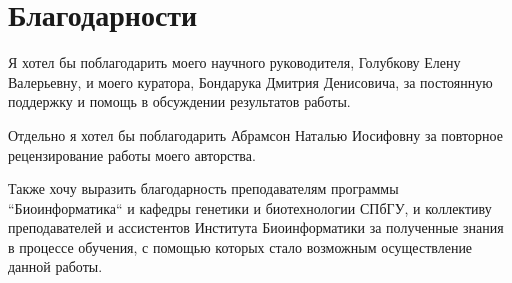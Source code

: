 \clearpage
\section{Благодарности}

Я хотел бы поблагодарить моего научного руководителя, Голубкову Елену Валерьевну, и моего куратора, Бондарука Дмитрия Денисовича, за постоянную поддержку и помощь в обсуждении результатов работы.

Отдельно я хотел бы поблагодарить Абрамсон Наталью Иосифовну за повторное рецензирование работы моего авторства.

Также хочу выразить благодарность преподавателям программы ``Биоинформатика`` и кафедры генетики и биотехнологии СПбГУ, и коллективу преподавателей и ассистентов Института Биоинформатики за полученные знания в процессе обучения, с помощью которых стало возможным осуществление данной работы.